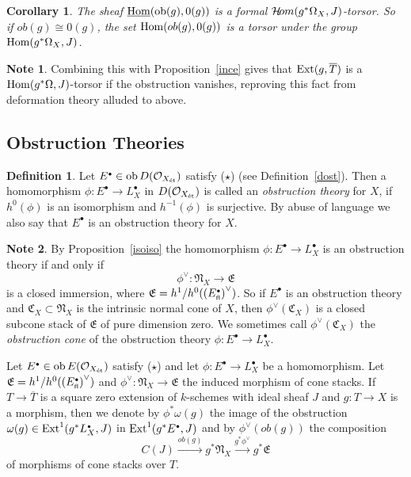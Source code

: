 \documentclass[11pt]{article}
\theoremstyle{plain}
\newtheorem{cor}[prop]{Corollary}
\theoremstyle{definition}
\newtheorem{defnp}[prop]{Definition}
\newenvironment{defn}{\begin{defnp}\normalfont}{\end{defnp}}
\newtheorem{notep}{Note}\renewcommand{\thenotep}{}
\newenvironment{note}{\begin{notep}\normalfont}{\end{notep}}
\newcommand{\dual}[1]{{{#1}^{\vee}}}
\newcommand{\et}{{\mbox{\tiny \'{e}t}}}
\newcommand{\fl}{{\mbox{\tiny fl}}}
\newcommand{\upst}{^{\ast}}
\newcommand{\com}{^{\scriptscriptstyle\bullet}}
\newcommand{\EE}{{\mathfrak{E}}}
\newcommand{\NN}{{\mathfrak{N}}}
\newcommand{\CC}{{\mathfrak{C}}}
\renewcommand{\O}{{\mathcal{O}}}
\newcommand{\hH}{{\mathcal{H}}}
\newcommand{\ob}{\mathop{\rm ob}}
\newcommand{\Hom}{\mathop{\rm Hom}\nolimits}
\newcommand{\Ext}{\mathop{\rm Ext}\nolimits}
\newcommand{\sheafhom}{\mathop{\rm {\mit{ \hH\! om}}}\nolimits}
\newcommand{\ol}{\overline}
\renewcommand{\ul}{\underline}
\providecommand{\Ext}{\operatorname{Ext}}
\theoremstyle{plain}
\theoremstyle{definition}
\theoremstyle{remark}
\begin{document}
\begin{cor}
The sheaf \(\ul{\Hom}(\ob(g),0(g))\) is a formal
\(\sheafhom(g\upst\Omega_X,J)\)-torsor. So if \(ob(g)\cong0(g)\), the set
\(\Hom(ob(g),0(g))\) is a torsor under the group
\(\Hom(g\upst\Omega_X,J)\).
\end{cor}

\begin{note}
Combining this with Proposition~\ref{ince} gives that \(\Ext(g,\ol T)\)
is a \(\Hom(g\upst\Omega,J)\)-torsor if the obstruction vanishes,
reproving this fact from deformation theory alluded to above.
\end{note}

\subsection{Obstruction Theories}

\begin{defn} \label{doot} Let \(E\com\in\ob D(\O_{X_\et})\) satisfy
(\(\star\)) (see Definition~\ref{dost}). Then a homomorphism
\(\phi:E\com\rightarrow L_X\com\) in \(D(\O_{X_\et})\) is called an {\em
obstruction theory }for \(X\), if \(h^0(\phi)\) is an isomorphism and
\(h^{-1}(\phi)\) is surjective. By abuse of language we also say that
\(E\com\) is an obstruction theory for \(X\).
\end{defn}

\begin{note}
By Proposition~\ref{isoiso} the homomorphism \(\phi:E\com\to L\com_X\)
is an obstruction theory if and only if
\[
\dual{\phi}:\NN_X\longrightarrow\EE
\]
is a closed immersion, where \(\EE= h^1/h^0(\dual{(E_\fl\com)})\).  So
if \(E\com\) is an obstruction theory and \(\CC_X\subset \NN_X\) is the
intrinsic normal cone of \(X\), then \(\dual{\phi}(\CC_X)\) is a closed
subcone stack of \(\EE\) of pure dimension zero. We sometimes call
\(\dual{\phi}(\CC_X)\) the {\em obstruction cone }of the obstruction
theory \(\phi:E\com\rightarrow L_X\com\).
\end{note}

Let \(E\com\in\ob E(\O_{X_\et})\) satisfy (\(\star\)) and let
\(\phi:E\com\to L\com_X\) be a homomorphism. Let
\(\EE=h^1/h^0(\dual{(E_\fl\com)})\) and \(\dual{\phi}:\NN_X\to\EE\) the
induced morphism of cone stacks. If \(T\to\ol T\) is a square zero
extension of \(k\)-schemes with ideal sheaf \(J\) and \(g:T\to X\) is a
morphism, then we denote by \(\phi\upst\omega(g)\) the image of the
obstruction \(\omega(g)\in\Ext^1(g\upst L_X\com,J)\) in \(\Ext^1(g\upst
E\com,J)\) and by \(\dual{\phi}(ob(g))\) the composition
\[
C(J)\stackrel{ob(g)}{\longrightarrow}
g\upst\NN_X \stackrel{g\upst\dual{\phi}}{\longrightarrow}g\upst\EE
\]
of morphisms of cone stacks over \(T\).
\end{document}
